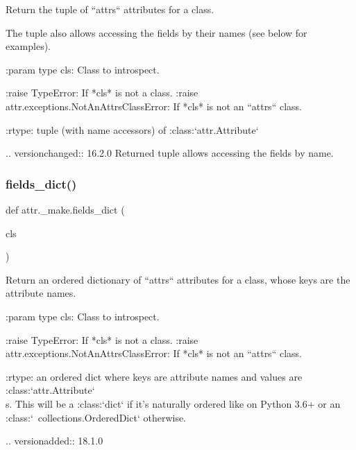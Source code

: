 \begin{DoxyVerb}Return the tuple of ``attrs`` attributes for a class.

The tuple also allows accessing the fields by their names (see below for
examples).

:param type cls: Class to introspect.

:raise TypeError: If *cls* is not a class.
:raise attr.exceptions.NotAnAttrsClassError: If *cls* is not an ``attrs``
    class.

:rtype: tuple (with name accessors) of :class:`attr.Attribute`

..  versionchanged:: 16.2.0 Returned tuple allows accessing the fields
    by name.
\end{DoxyVerb}
 \mbox{\label{namespaceattr_1_1__make_a5aaa5f8707fabad43bfc9c4e13d06198}} 
\subsubsection{\texorpdfstring{fields\+\_\+dict()}{fields\_dict()}}
{\footnotesize\ttfamily def attr.\+\_\+make.\+fields\+\_\+dict (\begin{DoxyParamCaption}\item[{}]{cls }\end{DoxyParamCaption})}

\begin{DoxyVerb}Return an ordered dictionary of ``attrs`` attributes for a class, whose
keys are the attribute names.

:param type cls: Class to introspect.

:raise TypeError: If *cls* is not a class.
:raise attr.exceptions.NotAnAttrsClassError: If *cls* is not an ``attrs``
    class.

:rtype: an ordered dict where keys are attribute names and values are
    :class:`attr.Attribute`\\ s. This will be a :class:`dict` if it's
    naturally ordered like on Python 3.6+ or an
    :class:`~collections.OrderedDict` otherwise.

.. versionadded:: 18.1.0
\end{DoxyVerb}
 \mbox{\label{namespaceattr_1_1__make_a9d60a5278881d72a5c8fc0bd59cf43db}} 
